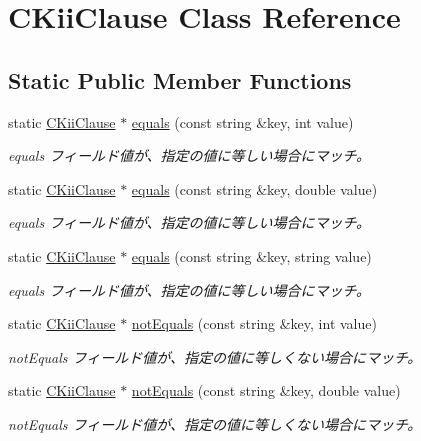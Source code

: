 \hypertarget{class_c_kii_clause}{\section{C\-Kii\-Clause Class Reference}
\label{class_c_kii_clause}
}
\subsection*{Static Public Member Functions}
\begin{DoxyCompactItemize}
\item 
static \hyperlink{class_c_kii_clause}{C\-Kii\-Clause} $\ast$ \hyperlink{class_c_kii_clause_a326352c2f470bcd311da688e5cd43c18}{equals} (const string \&key, int value)
\begin{DoxyCompactList}\small\item\em equals フィールド値が、指定の値に等しい場合にマッチ。 \end{DoxyCompactList}\item 
static \hyperlink{class_c_kii_clause}{C\-Kii\-Clause} $\ast$ \hyperlink{class_c_kii_clause_ad10d414b30fdef64a550e9763b1eb3d1}{equals} (const string \&key, double value)
\begin{DoxyCompactList}\small\item\em equals フィールド値が、指定の値に等しい場合にマッチ。 \end{DoxyCompactList}\item 
static \hyperlink{class_c_kii_clause}{C\-Kii\-Clause} $\ast$ \hyperlink{class_c_kii_clause_a1466940717918e116bb92fe79b34d88e}{equals} (const string \&key, string value)
\begin{DoxyCompactList}\small\item\em equals フィールド値が、指定の値に等しい場合にマッチ。 \end{DoxyCompactList}\item 
static \hyperlink{class_c_kii_clause}{C\-Kii\-Clause} $\ast$ \hyperlink{class_c_kii_clause_aa7f3d184a816779b4482396563130ae5}{not\-Equals} (const string \&key, int value)
\begin{DoxyCompactList}\small\item\em not\-Equals フィールド値が、指定の値に等しくない場合にマッチ。 \end{DoxyCompactList}\item 
static \hyperlink{class_c_kii_clause}{C\-Kii\-Clause} $\ast$ \hyperlink{class_c_kii_clause_ae79c90539577cbfc42f223b503508e89}{not\-Equals} (const string \&key, double value)
\begin{DoxyCompactList}\small\item\em not\-Equals フィールド値が、指定の値に等しくない場合にマッチ。 \end{DoxyCompactList}\item 

\end{DoxyCompactItemize}
